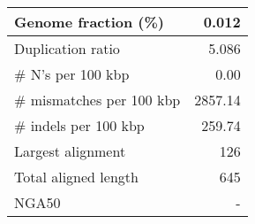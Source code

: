 \documentclass[12pt,a4paper]{article}
\begin{document}
\begin{table}[ht]
\begin{center}
\begin{tabular}{|l*{1}{|r}|}
Genome fraction (\%) & 0.012 \\ \hline
Duplication ratio & 5.086 \\ \hline
\# N's per 100 kbp & 0.00 \\ \hline
\# mismatches per 100 kbp & 2857.14 \\ \hline
\# indels per 100 kbp & 259.74 \\ \hline
Largest alignment & 126 \\ \hline
Total aligned length & 645 \\ \hline
NGA50 & - \\ \hline
\end{tabular}
\end{center}
\end{table}
\end{document}
